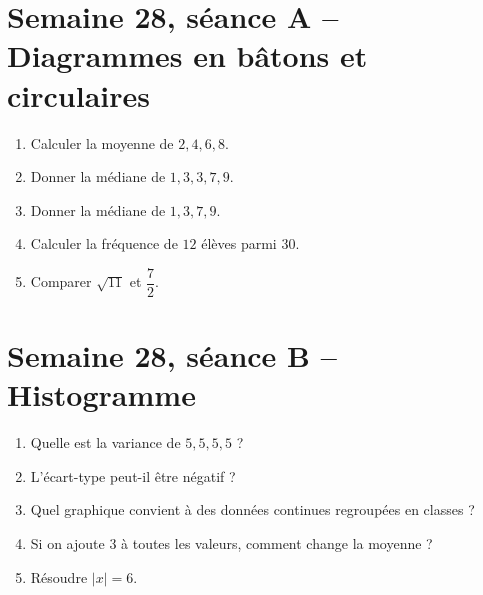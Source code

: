 \section{Semaine 28, séance A -- Diagrammes en bâtons et circulaires}
\begin{enumerate}
  \item Calculer la moyenne de $2,4,6,8$.
  \item Donner la médiane de $1,3,3,7,9$.
  \item Donner la médiane de $1,3,7,9$.
  \item Calculer la fréquence de $12$ élèves parmi $30$.
  \item Comparer $\sqrt{11}$ et $\dfrac72$.
\end{enumerate}

\section{Semaine 28, séance B -- Histogramme}
\begin{enumerate}
  \item Quelle est la variance de $5,5,5,5$ ?
  \item L'écart-type peut-il être négatif ?
  \item Quel graphique convient à des données continues regroupées en classes ?
  \item Si on ajoute $3$ à toutes les valeurs, comment change la moyenne ?
  \item Résoudre $|x|=6$.
\end{enumerate}

